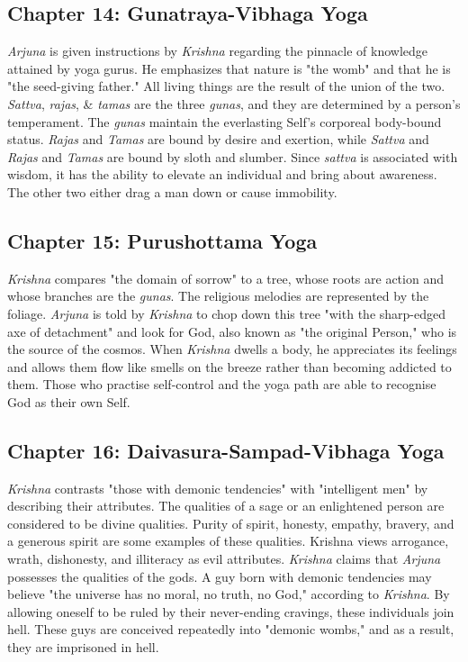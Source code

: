 \documentclass[runningheads]{llncs}
\begin{document}
\subsection{Chapter 14: Gunatraya-Vibhaga Yoga}
\textit{Arjuna} is given instructions by \textit{Krishna} regarding the pinnacle of knowledge attained by yoga gurus. He emphasizes that nature is "the womb" and that he is "the seed-giving father." All living things are the result of the union of the two. \textit{Sattva}, \textit{rajas}, \& \textit{tamas} are the three \textit{gunas}, and they are determined by a person's temperament. The \textit{gunas} maintain the everlasting Self's corporeal body-bound status. \textit{Rajas} and \textit{Tamas} are bound by desire and exertion, while \textit{Sattva} and \textit{Rajas} and \textit{Tamas} are bound by sloth and slumber. Since \textit{sattva} is associated with wisdom, it has the ability to elevate an individual and bring about awareness. The other two either drag a man down or cause immobility.
\subsection{Chapter 15: Purushottama Yoga}
\textit{Krishna} compares "the domain of sorrow" to a tree, whose roots are action and whose branches are the \textit{gunas}. The religious melodies are represented by the foliage. \textit{Arjuna} is told by \textit{Krishna} to chop down this tree "with the sharp-edged axe of detachment" and look for God, also known as "the original Person," who is the source of the cosmos. When \textit{Krishna} dwells a body, he appreciates its feelings and allows them flow like smells on the breeze rather than becoming addicted to them. Those who practise self-control and the yoga path are able to recognise God as their own Self.
\subsection{Chapter 16: Daivasura-Sampad-Vibhaga Yoga	}
\textit{Krishna} contrasts "those with demonic tendencies" with "intelligent men" by describing their attributes. The qualities of a sage or an enlightened person are considered to be divine qualities. Purity of spirit, honesty, empathy, bravery, and a generous spirit are some examples of these qualities. Krishna views arrogance, wrath, dishonesty, and illiteracy as evil attributes. \textit{Krishna} claims that \textit{Arjuna }possesses the qualities of the gods. A guy born with demonic tendencies may believe "the universe has no moral, no truth, no God," according to \textit{Krishna}. By allowing oneself to be ruled by their never-ending cravings, these individuals join hell. These guys are conceived repeatedly into "demonic wombs," and as a result, they are imprisoned in hell.
\end{document}
